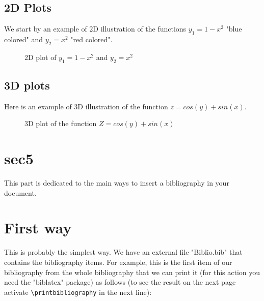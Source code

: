 \subsection{2D Plots}
We start by an example of 2D illustration of the functions $y_1=1-x^2$ "blue colored" and $y_2=x^2$ "red colored".
\begin{figure}[H]
	\centering
	\caption{2D plot of $y_1=1-x^2$ and $y_2=x^2$  }
	\label{fig:Plot_3d}
\end{figure}

\subsection{3D plots}
Here is an example of 3D illustration of the function $z=cos(y) + sin(x)$.
\begin{figure}[H]
	\centering
	\caption{3D plot of the function $Z=cos(y) + sin(x)$}
	\label{fig:Plot_3d}
\end{figure}

\section{sec5}
This part is dedicated to the main ways to insert a bibliography in your document.
\section{First way}
This is probably the simplest way. We have an external file "Biblio.bib" that contains the bibliography items.
For example, this is the first item of our bibliography \cite{01} from the whole bibliography that we can print it (for this action you need the "biblatex" package) as follows (to see the result on the next page activate \verb=\printbibliography= in the next line):

